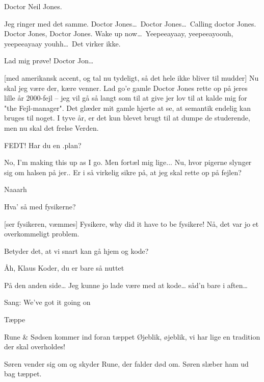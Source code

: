 \documentclass[danish]{article}
\begin{document}
\begin{sketch}
 Doctor Neil Jones.

 Jeg ringer med det samme.  Doctor Jones\ldots\ 
Doctor Jones\ldots\ Calling doctor Jones. Doctor Jones, Doctor Jones. Wake up now\ldots\ 
Yeepeeayaay, yeepeeayoouh, yeepeeayaay youhh\ldots\ Det virker ikke.

\says{Else} Lad mig prøve! \act{tager mobilen} Doctor Jon\ldots

\says{DJ}[med amerikansk accent, og tal nu tydeligt, så det hele ikke bliver til
mudder] Nu skal jeg være der, kære venner. Lad go'e gamle Doctor Jones rette op
på jeres lille år 2000-fejl -- jeg vil gå så langt som til at give jer lov til at
kalde mig for "the Fejl-manager". Det glæder mit gamle hjerte at se, at semantik
endelig kan bruges til noget. I tyve år, er det kun blevet brugt til at dumpe de
studerende, men nu skal det frelse Verden.

 FEDT! Har du en .plan?

 No, I'm making this up as I go. Men fortæl mig lige...  Nu, hvor
pigerne slynger sig om halsen på jer.. Er i så virkelig sikre på, at jeg skal
rette op på fejlen?

 Naaarh

 Hva' så med fysikerne?

[ser fysikeren, væmmes] Fysikere, why did it have to be fysikere! 
 Nå, det var jo et overkommeligt problem.

 Betyder det, at vi snart kan gå hjem og kode?

 Åh, Klaus Koder, du er bare så nuttet 

\says{KK} På den anden side\ldots{} Jeg kunne jo lade være med at kode\ldots{} såd'n bare i 
aften\ldots

\scene Sang: We've got it going on
\bigskip

Tæppe

\bigskip

Rune \& Sødsen kommer ind foran tæppet
 Øjeblik, øjeblik, vi har lige en tradition der skal
overholdes!

\scene
Søren vender sig om og skyder Rune, der falder død om. Søren slæber
ham ud bag tæppet.


\end{sketch}
\end{document}
